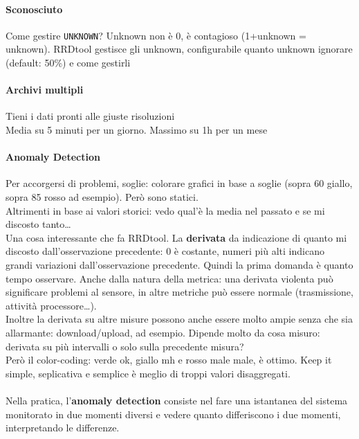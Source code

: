 \documentclass[10pt]{book}
\begin{document}
\paragraph{Sconosciuto} Come gestire \texttt{UNKNOWN}? Unknown non è 0, è contagioso (1+unknown = unknown). RRDtool gestisce gli unknown, configurabile quanto unknown ignorare (default: 50\%) e come gestirli
\paragraph{Archivi multipli} Tieni i dati pronti alle giuste risoluzioni\\
Media su 5 minuti per un giorno.
Massimo su 1h per un mese
\paragraph{Anomaly Detection} Per accorgersi di problemi, soglie: colorare grafici in base a soglie (sopra 60 giallo, sopra 85 rosso ad esempio). Però sono statici.\\
Altrimenti in base ai valori storici: vedo qual'è la media nel passato e se mi discosto tanto\ldots\\
Una cosa interessante che fa RRDtool. La \textbf{derivata} da indicazione di quanto mi discosto dall'osservazione precedente: 0 è costante, numeri più alti indicano grandi variazioni dall'osservazione precedente. Quindi la prima domanda è quanto tempo osservare. Anche dalla natura della metrica: una derivata violenta può significare problemi al sensore, in altre metriche può essere normale (trasmissione, attività processore\ldots).\\
Inoltre la derivata su altre misure possono anche essere molto ampie senza che sia allarmante: download/upload, ad esempio. Dipende molto da cosa misuro: derivata su più intervalli o solo sulla precedente misura?\\
Però il color-coding: verde ok, giallo mh e rosso male male, è ottimo. Keep it simple, seplicativa e semplice è meglio di troppi valori disaggregati.\\\\
Nella pratica, l'\textbf{anomaly detection} consiste nel fare una istantanea del sistema monitorato in due momenti diversi e vedere quanto differiscono i due momenti, interpretando le differenze.
\end{document}
